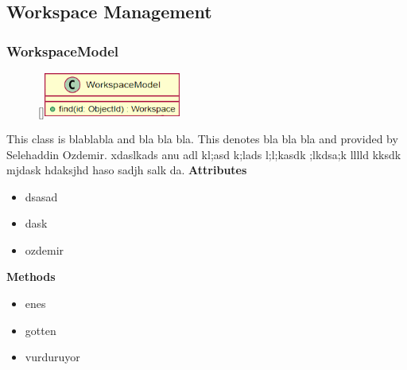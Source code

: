 \subsection{Workspace Management}

\subsubsection{WorkspaceModel}
\begin{figure}
    \raisebox{0pt}[\dimexpr{}\baselineskip\relax]{\includegraphics[width=4.5cm]{classes/workspace-management/1.png}}
\end{figure} 
\par
This class is blablabla and bla bla bla. This denotes bla bla bla and provided by Selehaddin Ozdemir. xdaslkads anu adl kl;asd k;lads l;l;kasdk ;lkdsa;k lllld kksdk mjdask hdaksjhd haso sadjh salk da.
\newline
\newline
\textbf{Attributes}
\begin{itemize}
    \item dsasad
    \item dask
    \item ozdemir
\end{itemize}
\textbf{Methods}
\begin{itemize}
    \item enes
    \item gotten
    \item vurduruyor
\end{itemize}


